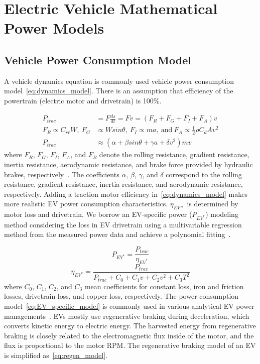 \documentclass{IEEEtran}
\begin{document}
\section{Electric Vehicle Mathematical Power Models}

\subsection{Vehicle Power Consumption Model}

A vehicle dynamics equation is commonly used vehicle power consumption model~\eqref{eq:dynamics_model}. There is an assumption that efficiency of the powertrain (electric motor and drivetrain) is 100\%. 

\begin{equation}  \label{eq:dynamics_model} %
\begin{split}
P_{trac}	&= F \frac{ds}{dt} = Fv= (F_{R} + F_{G} + F_{I} + F_{A}) v \\
F_{R} \propto C_{rr}W,~F_{G} &\propto Wsin\theta,~F_{I} \propto ma,~\text{and}~F_{A} \propto \frac{1}{2} \rho C_d Av^2 \\
P_{trac} &\approx (\alpha  + \beta sin\theta + \gamma a + \delta v^2)mv
\end{split}
\end{equation}
where $F_R$, $F_G$, $F_I$, $F_A$, and $F_B$ denote the rolling resistance, gradient resistance, inertia resistance, aerodynamic resistance, and brake force provided by hydraulic brakes, respectively~\cite{Park:DAC13}. The coefficients $\alpha$, $\beta$, $\gamma$, and $\delta$ correspond to the rolling resistance, gradient resistance, inertia resistance, and aerodynamic resistance, respectively.
Adding a traction motor efficiency in~\eqref{eq:dynamics_model} makes more realistic EV power consumption characteristics. $\eta_{EV*}$ is determined by motor loss and drivetrain.  
We borrow an EV-specific power ($P_{EV^*}$) modeling method considering the loss in EV drivetrain using a multivariable regression method from the measured power data and achieve a polynomial fitting~\cite{Hong:ASPDAC16}.

\begin{equation} \label{eq:EV_specific_model} %
P_{EV^*} = \frac{P_{trac}}{\eta_{EV^*}}
\end{equation} 
\begin{equation}
\eta_{EV^*} = \frac{P_{trac}}{{P_{trac} + C_0 + C_1 v + C_2 v^2 + C_3 T^2}}\nonumber
\end{equation}	
where $C_0$, $C_1$, $C_2$, and $C_3$ mean coefficients for constant loss, iron and friction losses, drivetrain loss, and copper loss, respectively. The power consumption model~\eqref{eq:EV_specific_model} is commonly used in various analytical EV power managements~\cite{Dib:IVPPC11, Dib:CEP14}.
EVs mostly use regenerative braking during deceleration, which converts kinetic energy to electric energy. The harvested energy from regenerative braking is closely related to the electromagnetic flux inside of the motor, and the flux is proportional to the motor RPM. The regenerative braking model of an EV is simplified as~\eqref{eq:regen_model}.
\end{document}
